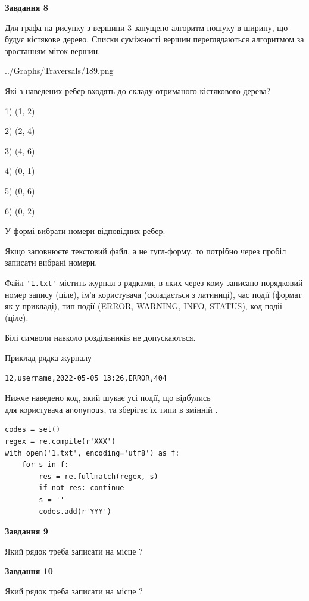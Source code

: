 \documentclass[12pt, ukrainian]{article}
\def\code#1{\Verb!#1!}
\begin{document}
{\begin {large}
{\begin {center}\textbf{Завдання 8}\end {center}}\par
Для графа на рисунку з вершини 3 запущено алгоритм пошуку в ширину, що будує кістякове дерево. Списки суміжності вершин переглядаються алгоритмом за зростанням міток вершин.\par
\begin{center}
	{../Graphs/Traversals/189.png}
\end{center}
\par Які з наведених ребер входять до складу отриманого кістякового дерева?\par
1) (1, 2)\par
2) (2, 4)\par
3) (4, 6)\par
4) (0, 1)\par
5) (0, 6)\par
6) (0, 2)\par
{\vskip 15pt} У формі вибрати номери відповідних ребер.


Якщо заповнюєте текстовий файл, а не гугл-форму, то потрібно через пробіл записа\-ти вибрані номери.\par
\newpage


Файл \code{'1.txt'} містить журнал з рядками, в яких через кому записано поряд\-ко\-вий номер запису (ціле), ім'я користувача (складається з латиниці), час події (фор\-мат як у прикладі), тип події (ERROR, WARNING, INFO, STATUS), код події (ціле).

Білі символи навколо роздільників не допускаються.

Приклад рядка журналу



\begin{verbatim}
12,username,2022-05-05 13:26,ERROR,404
\end{verbatim}


Нижче наведено код, який шукає усі події, що відбулись\\ для користувача \code{anonymous}, та зберігає їх типи в змінній .



\begin{verbatim}
codes = set()
regex = re.compile(r'XXX')
with open('1.txt', encoding='utf8') as f:
    for s in f:
        res = re.fullmatch(regex, s)
        if not res: continue
        s = ''
        codes.add(r'YYY')
\end{verbatim}


{\begin {center}\textbf{Завдання 9}\end {center}}\par
Який рядок треба записати на місце  ?\par
\vspace{5mm}


{\begin {center}\textbf{Завдання 10}\end {center}}\par
Який рядок треба записати на місце  ?\par


\newpage


\end {large}}
\end{document}
